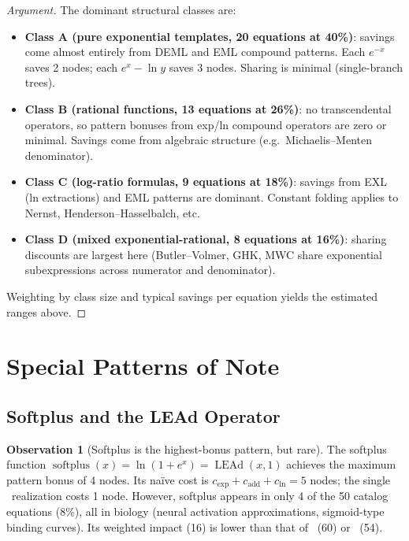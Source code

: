 \documentclass[12pt,a4paper]{article}
\theoremstyle{definition}
\newtheorem{observation}[theorem]{Observation}
\newcommand{\EML}{\operatorname{EML}}
\newcommand{\EXL}{\operatorname{EXL}}
\newcommand{\LEAd}{\operatorname{LEAd}}
\begin{document}
\begin{proof}[Argument]
The dominant structural classes are:
\begin{itemize}
  \item \textbf{Class A (pure exponential templates, 20 equations at 40\%)}:
        savings come almost entirely from DEML and EML compound patterns.
        Each $e^{-x}$ saves 2 nodes; each $e^x - \ln y$ saves 3 nodes.
        Sharing is minimal (single-branch trees).
  \item \textbf{Class B (rational functions, 13 equations at 26\%)}:
        no transcendental operators, so pattern bonuses from exp/ln compound
        operators are zero or minimal.  Savings come from algebraic structure
        (e.g.\ Michaelis--Menten denominator).
  \item \textbf{Class C (log-ratio formulas, 9 equations at 18\%)}:
        savings from EXL (ln extractions) and EML patterns are dominant.
        Constant folding applies to Nernst, Henderson--Hasselbalch, etc.
  \item \textbf{Class D (mixed exponential-rational, 8 equations at 16\%)}:
        sharing discounts are largest here (Butler--Volmer, GHK, MWC share
        exponential subexpressions across numerator and denominator).
\end{itemize}
Weighting by class size and typical savings per equation yields the estimated
ranges above.
\end{proof}

\section{Special Patterns of Note}
\label{sec:special}

\subsection{Softplus and the LEAd Operator}

\begin{observation}[Softplus is the highest-bonus pattern, but rare]
\label{obs:softplus}
The softplus function $\operatorname{softplus}(x) = \ln(1+e^x) = \LEAd(x,1)$
achieves the maximum pattern bonus of 4 nodes.
Its na\"{i}ve cost is $c_{\exp}+c_{\mathrm{add}}+c_{\ln} = 5$ nodes;
the single \LEAd\ realization costs 1 node.
However, softplus appears in only 4 of the 50 catalog equations (8\%), all
in biology (neural activation approximations, sigmoid-type binding curves).
Its weighted impact (16) is lower than that of \EXL\ (60) or \EML\ (54).
\end{observation}
\end{document}
